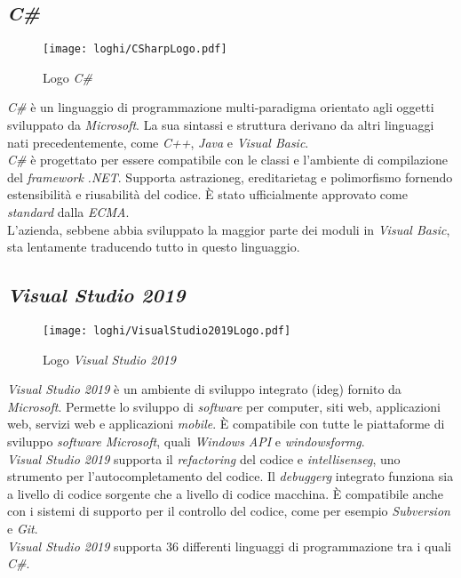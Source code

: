 \subsection*{\textit{C\#}}
\begin{figure}[!h] 
    \centering 
    \texttt{[image: loghi/CSharpLogo.pdf]} 
    \caption{Logo \textit{C\#}}
 \end{figure}
\noindent \textit{C\#} è un linguaggio di programmazione multi-paradigma orientato agli oggetti
sviluppato da \textit{Microsoft}. La sua sintassi e struttura derivano da altri linguaggi nati
precedentemente, come \textit{C++}, \textit{Java} e \textit{Visual Basic}.\\
\textit{C\#} è progettato per essere compatibile con le classi e l’ambiente di compilazione
del \textit{framework} \textit{.NET}. Supporta \gls{astrazioneg}, \gls{ereditarietag} e polimorfismo
fornendo estensibilità e riusabilità del codice.
È stato ufficialmente approvato come \textit{standard} dalla \textit{ECMA}.\\
L'azienda, sebbene abbia sviluppato la maggior parte dei moduli
in \textit{Visual Basic}, sta lentamente traducendo tutto in questo linguaggio.

\subsection*{\textit{Visual Studio 2019}}
\begin{figure}[!h] 
    \centering 
    \texttt{[image: loghi/VisualStudio2019Logo.pdf]} 
    \caption{Logo \textit{Visual Studio 2019}}
 \end{figure}
\noindent \textit{Visual Studio 2019} è un ambiente di sviluppo integrato (\gls{ideg}) fornito da \textit{Microsoft}.
Permette lo sviluppo di \textit{software} per computer, siti web, applicazioni web, servizi web
e applicazioni \textit{mobile}. È compatibile con tutte le piattaforme di sviluppo
\textit{software} \textit{Microsoft}, quali \textit{Windows API} e \textit{\gls{windowsformg}}.\\
\textit{Visual Studio 2019} supporta il \textit{refactoring} del codice e \textit{\gls{intellisenseg}}, uno strumento per
l’autocompletamento del codice. Il \textit{\gls{debuggerg}} integrato funziona sia a
livello di codice sorgente che a livello di codice macchina. È compatibile anche con i sistemi di supporto per il controllo del codice,
come per esempio \textit{Subversion} e \textit{Git}.\\
\textit{Visual Studio 2019} supporta 36 differenti linguaggi di 
programmazione tra i quali \textit{C\#}.

